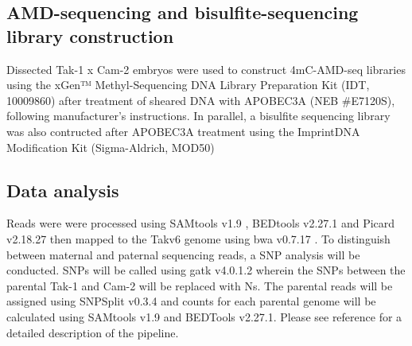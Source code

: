 \subsection{AMD-sequencing and bisulfite-sequencing library construction}

Dissected Tak-1 x Cam-2 embryos were used to construct 4mC-AMD-seq libraries using the xGen™ Methyl-Sequencing DNA Library Preparation Kit (IDT, 10009860) after treatment of sheared DNA with APOBEC3A (NEB \#E7120S), following manufacturer’s instructions. In parallel, a bisulfite sequencing library was also contructed after APOBEC3A treatment using the Imprint\textregistered DNA Modification Kit (Sigma-Aldrich, MOD50)


\subsection{Data analysis}

Reads were were processed using SAMtools v1.9 \citep{RN174}, BEDtools v2.27.1 \citep{RN90} and Picard v2.18.27 \citep{RN173} then mapped to the Takv6 genome \citep{RN179} using bwa v0.7.17 \citep{RN182}. To distinguish between maternal and paternal sequencing reads, a SNP analysis will be conducted. SNPs will be called using gatk v4.0.1.2 \citep{RN177} wherein the SNPs between the parental Tak-1 and Cam-2 will be replaced with Ns. The parental reads will be assigned using SNPSplit v0.3.4 \citep{RN178} and counts for each parental genome will be calculated using SAMtools v1.9 and BEDTools v2.27.1. Please see reference \cite{RN160}  for a detailed description of the pipeline.

